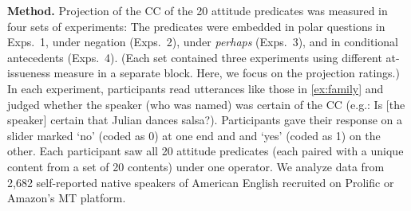 \documentclass[12pt, a4paper]{article}
\begin{document}
\noindent 
{\bf Method.}
	Projection of the CC of the 20 attitude predicates was measured in four sets of experiments: The predicates were embedded in polar questions in Exps.\ 1, under negation (Exps.\ 2), under {\em perhaps} (Exps.\ 3), and in conditional antecedents (Exps.\ 4). (Each set contained three experiments using different at-issueness measure in a separate block. Here, we focus on the projection ratings.)
	In each experiment, participants read utterances like those in \ref{ex:family} and judged whether the speaker (who was named) was certain of the CC (e.g.: Is [the speaker] certain that Julian dances salsa?). Participants gave their response on a slider marked `no' (coded as 0) at one end and and `yes' (coded as 1) on the other. Each participant saw all 20 attitude predicates (each paired with a unique content from a set of 20 contents) under one operator. We analyze data from 2,682 self-reported native speakers of American English recruited on Prolific or Amazon's MT platform.
\end{document}
